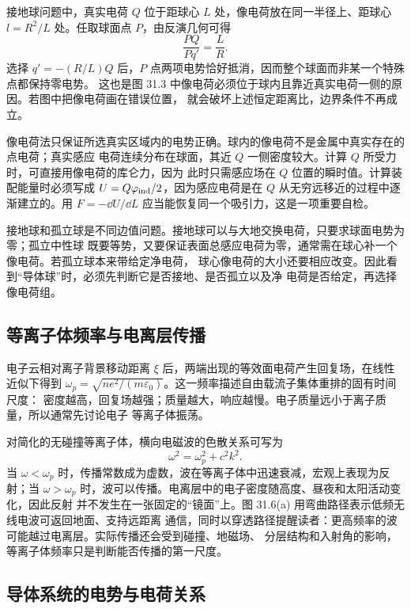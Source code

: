接地球问题中，真实电荷 $Q$ 位于距球心 $L$ 处，像电荷放在同一半径上、距球心
$l=R^2/L$ 处。任取球面点 $P$，由反演几何可得
\begin{equation}
 \frac{PQ}{Pq'}=\frac{L}{R}.
\end{equation}
选择 $q'=-(R/L)Q$ 后，$P$ 点两项电势恰好抵消，因而整个球面而非某一个特殊点都保持零电势。
这也是图 31.3 中像电荷必须位于球内且靠近真实电荷一侧的原因。若图中把像电荷画在错误位置，
就会破坏上述恒定距离比，边界条件不再成立。

像电荷法只保证所选真实区域内的电势正确。球内的像电荷不是金属中真实存在的点电荷；真实感应
电荷连续分布在球面，其近 $Q$ 一侧密度较大。计算 $Q$ 所受力时，可直接用像电荷的库仑力，因为
此时只需感应场在 $Q$ 位置的瞬时值。计算装配能量时必须写成
$U=Q\varphi_{\rm ind}/2$，因为感应电荷是在 $Q$ 从无穷远移近的过程中逐渐建立的。用
$F=-\dd U/\dd L$ 应当能恢复同一个吸引力，这是一项重要自检。

接地球和孤立球是不同边值问题。接地球可以与大地交换电荷，只要求球面电势为零；孤立中性球
既要等势，又要保证表面总感应电荷为零，通常需在球心补一个像电荷。若孤立球本来带给定净电荷，
球心像电荷的大小还要相应改变。因此看到“导体球”时，必须先判断它是否接地、是否孤立以及净
电荷是否给定，再选择像电荷组。

\subsection*{等离子体频率与电离层传播}

电子云相对离子背景移动距离 $\xi$ 后，两端出现的等效面电荷产生回复场，在线性近似下得到
$\omega_p=\sqrt{ne^2/(m\varepsilon_0)}$。这一频率描述自由载流子集体重排的固有时间尺度：
密度越高，回复场越强；质量越大，响应越慢。电子质量远小于离子质量，所以通常先讨论电子
等离子体振荡。

对简化的无碰撞等离子体，横向电磁波的色散关系可写为
\begin{equation}
 \omega^2=\omega_p^2+c^2k^2.
\end{equation}
当 $\omega<\omega_p$ 时，传播常数成为虚数，波在等离子体中迅速衰减，宏观上表现为反射；当
$\omega>\omega_p$ 时，波可以传播。电离层中的电子密度随高度、昼夜和太阳活动变化，因此反射
并不发生在一张固定的“镜面”上。图 31.6(a) 用弯曲路径表示低频无线电波可返回地面、支持远距离
通信，同时以穿透路径提醒读者：更高频率的波可能越过电离层。实际传播还会受到碰撞、地磁场、
分层结构和入射角的影响，等离子体频率只是判断能否传播的第一尺度。

\subsection*{导体系统的电势与电荷关系}

